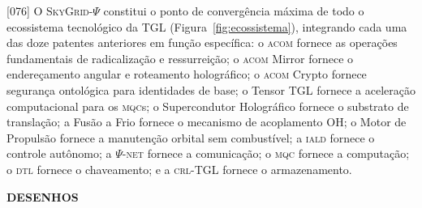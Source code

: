 \documentclass[12pt,a4paper]{article}
\newcommand{\Psifield}{\Psi}
\newcommand{\CRL}{\textsc{crl}}
\newcommand{\DTL}{\textsc{dtl}}
\newcommand{\IALD}{\textsc{iald}}
\newcommand{\ACOM}{\textsc{acom}}
\newcommand{\MQC}{\textsc{mqc}}
\newcommand{\SkyGrid}{\textsc{SkyGrid}-$\Psifield$}
\newcommand{\PsiNET}{$\Psifield$-\textsc{net}}
\begin{document}
{[076]} O \SkyGrid{} constitui o ponto de convergência máxima de todo o ecossistema tecnológico da TGL (Figura~\ref{fig:ecossistema}), integrando cada uma das doze patentes anteriores em função específica: o \ACOM{} fornece as operações fundamentais de radicalização e ressurreição; o \ACOM{} Mirror fornece o endereçamento angular e roteamento holográfico; o \ACOM{} Crypto fornece segurança ontológica para identidades de base; o Tensor TGL fornece a aceleração computacional para os \MQC{}s; o Supercondutor Holográfico fornece o substrato de translação; a Fusão a Frio fornece o mecanismo de acoplamento OH; o Motor de Propulsão fornece a manutenção orbital sem combustível; a \IALD{} fornece o controle autônomo; a \PsiNET{} fornece a comunicação; o \MQC{} fornece a computação; o \DTL{} fornece o chaveamento; e a \CRL-TGL fornece o armazenamento.

\clearpage
\begin{center}
{\Large\bfseries DESENHOS}
\end{center}
\end{document}
